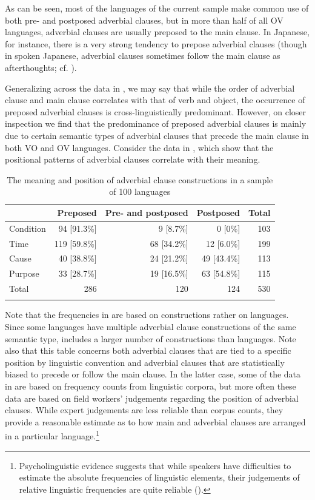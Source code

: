 \documentclass[output=paper]{langsci/langscibook}
\begin{document}
As can be seen, most of the languages of the current sample make common use of both pre- and postposed adverbial clauses, but in more than half of all OV languages, adverbial clauses are usually preposed to the main clause. In Japanese, for instance, there is a very strong tendency to prepose adverbial clauses (though in spoken Japanese, adverbial clauses sometimes follow the main clause as afterthoughts; cf. \citealt{FordMori1994}).

Generalizing across the data in , we may say that while the order of adverbial clause and main clause correlates with that of verb and object, the occurrence of preposed adverbial clauses is cross-linguistically predominant. However, on closer inspection we find that the predominance of preposed adverbial clauses is mainly due to certain semantic types of adverbial clauses that precede the main clause in both VO and OV languages. Consider the data in , which show that the positional patterns of adverbial clauses correlate with their meaning.  

\begin{table}
\begin{tabularx}{\textwidth}{Xrrrr} 
\lsptoprule
&   Preposed &   Pre- and postposed &   Postposed &   Total\\
\midrule
Condition & 94 [91.3\%] & 9 [8.7\%] & 0 [0\%] & 103\\
Time & 119 [59.8\%] & 68 [34.2\%] & 12 [6.0\%] & 199\\
Cause & 40 [38.8\%] & 24 [21.2\%] & 49 [43.4\%] & 113\\
Purpose & 33 [28.7\%] & 19 [16.5\%] & 63 [54.8\%] & 115\\
\midrule 
Total & 286 & 120 & 124 & 530\\
\lspbottomrule
\end{tabularx}

\caption{The meaning and position of adverbial clause constructions in a sample of 100 languages}
\label{tab:diessel:2}
\end{table}

Note that the frequencies in  are based on constructions rather on languages. Since some languages have multiple adverbial clause constructions of the same semantic type,  includes a larger number of constructions than languages. Note also that this table concerns both adverbial clauses that are tied to a specific position by linguistic convention and adverbial clauses that are statistically biased to precede or follow the main clause. In the latter case, some of the data in  are based on frequency counts from linguistic corpora, but more often these data are based on field workers’ judgements regarding the position of adverbial clauses. While expert judgements are less reliable than corpus counts, they provide a reasonable estimate as to how main and adverbial clauses are arranged in a particular language.\footnote{Psycholinguistic evidence suggests that while speakers have difficulties to estimate the absolute frequencies of linguistic elements, their judgements of relative linguistic frequencies are quite reliable (\citealt{HasherZacks1984}).}
\end{document}
